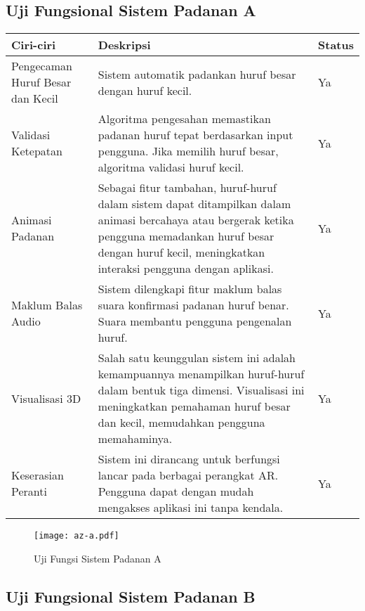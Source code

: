 \begin{itemize}
\begin{itemize}
\begin{itemize}
\begin{itemize}
\begin{itemize}
\begin{itemize}
\begin{itemize}
\begin{itemize}
\begin{flushleft}
\subsection{ Uji Fungsional  Sistem Padanan A }



\begin{tabular}{>{\raggedright}p{3cm}p{9cm}>{\centering\arraybackslash}p{2cm}}
\toprule
\textbf{Ciri-ciri} & \textbf{Deskripsi} & \textbf{Status} \\
\midrule
Pengecaman Huruf Besar dan Kecil & Sistem automatik padankan huruf besar dengan huruf kecil. & Ya \\

Validasi Ketepatan & Algoritma pengesahan memastikan padanan huruf tepat berdasarkan input pengguna. Jika memilih huruf besar, algoritma validasi huruf kecil. & Ya \\

Animasi Padanan & Sebagai fitur tambahan, huruf-huruf dalam sistem dapat ditampilkan dalam animasi bercahaya atau bergerak ketika pengguna memadankan huruf besar dengan huruf kecil, meningkatkan interaksi pengguna dengan aplikasi. & Ya \\

Maklum Balas Audio & Sistem dilengkapi fitur maklum balas suara konfirmasi padanan huruf benar. Suara membantu pengguna pengenalan huruf. & Ya \\

Visualisasi 3D & Salah satu keunggulan sistem ini adalah kemampuannya menampilkan huruf-huruf dalam bentuk tiga dimensi. Visualisasi ini meningkatkan pemahaman huruf besar dan kecil, memudahkan pengguna memahaminya. & Ya \\

Keserasian Peranti & Sistem ini dirancang untuk berfungsi lancar pada berbagai perangkat AR. Pengguna dapat dengan mudah mengakses aplikasi ini tanpa kendala. & Ya \\
\bottomrule
\end{tabular}

\clearpage
\begin{figure}
    \centering
    \texttt{[image: az-a.pdf]}
    \caption{Uji Fungsi Sistem Padanan A}
    \label{fig:eaz-a.pdf}
\end{figure}
\clearpage


\subsection{ Uji Fungsional  Sistem Padanan B}



\end{flushleft}
\end{itemize}
\end{itemize}
\end{itemize}
\end{itemize}
\end{itemize}
\end{itemize}
\end{itemize}
\end{itemize}
